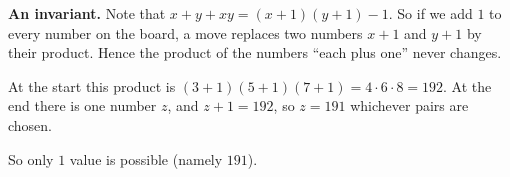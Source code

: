 \textbf{An invariant.} Note that $x+y+xy=(x+1)(y+1)-1$. So if we add $1$ to every number on the board, a move replaces two numbers $x+1$ and $y+1$ by their product. Hence the product of the numbers ``each plus one'' never changes.

At the start this product is $(3+1)(5+1)(7+1)=4\cdot6\cdot8=192$. At the end there is one number $z$, and $z+1=192$, so $z=191$ whichever pairs are chosen.

So only $\boxed{1}$ value is possible (namely $191$).
